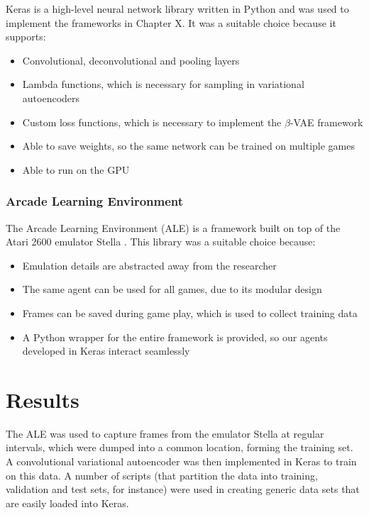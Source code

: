 \documentclass[12pt,twoside]{article}
\begin{document}
Keras is a high-level neural network library written in Python \cite{Chollet2015} and was used to implement the frameworks in Chapter X. It was a suitable choice because it supports:

\begin{itemize}
\item Convolutional, deconvolutional and pooling layers
\item Lambda functions, which is necessary for sampling in variational autoencoders
\item Custom loss functions, which is necessary to implement the $\beta$-VAE framework
\item Able to save weights, so the same network can be trained on multiple games
\item Able to run on the GPU
\end{itemize}

\subsubsection{Arcade Learning Environment}
The Arcade Learning Environment (ALE) is a framework built on top of the Atari 2600 emulator Stella \cite{Bellemare2015}. This library was a suitable choice because:
\begin{itemize}
\item Emulation details are abstracted away from the researcher
\item The same agent can be used for all games, due to its modular design
\item Frames can be saved during game play, which is used to collect training data
\item A Python wrapper for the entire framework is provided, so our agents developed in Keras interact seamlessly
\end{itemize}

\section{Results}
\label{sec:results}

The ALE was used to capture frames from the emulator Stella at regular intervals, which were dumped into a common location, forming the training set. A convolutional variational autoencoder was then implemented in Keras to train on this data. A number of scripts (that partition the data into training, validation and test sets, for instance) were used in creating generic data sets that are easily loaded into Keras.\\
\end{document}
